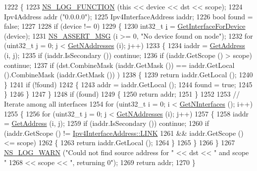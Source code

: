\begin{DoxyCode}
1222 \{
1223   \hyperlink{log-macros-disabled_8h_a90b90d5bad1f39cb1b64923ea94c0761}{NS\_LOG\_FUNCTION} (\textcolor{keyword}{this} << device << dst << scope);
1224   Ipv4Address addr (\textcolor{stringliteral}{"0.0.0.0"});
1225   Ipv4InterfaceAddress iaddr; 
1226   \textcolor{keywordtype}{bool} found = \textcolor{keyword}{false};
1227 
1228   \textcolor{keywordflow}{if} (device != 0)
1229     \{
1230       int32\_t \hyperlink{bernuolliDistribution_8m_a6f6ccfcf58b31cb6412107d9d5281426}{i} = \hyperlink{classns3_1_1Ipv4L3Protocol_a4640baab6b3879020a4146f17e293321}{GetInterfaceForDevice} (device);
1231       \hyperlink{assert_8h_aff5ece9066c74e681e74999856f08539}{NS\_ASSERT\_MSG} (i >= 0, \textcolor{stringliteral}{"No device found on node"});
1232       \textcolor{keywordflow}{for} (uint32\_t j = 0; j < \hyperlink{classns3_1_1Ipv4L3Protocol_ab816ec1b5f680117bc1363b3d9649b22}{GetNAddresses} (i); j++)
1233         \{
1234           iaddr = \hyperlink{classns3_1_1Ipv4L3Protocol_a85fa4287313a773dee29aa73fa74a7e0}{GetAddress} (i, j);
1235           \textcolor{keywordflow}{if} (iaddr.IsSecondary ()) \textcolor{keywordflow}{continue};
1236           \textcolor{keywordflow}{if} (iaddr.GetScope () > scope) \textcolor{keywordflow}{continue}; 
1237           \textcolor{keywordflow}{if} (dst.CombineMask (iaddr.GetMask ())  == iaddr.GetLocal ().CombineMask (iaddr.GetMask ()) )
1238             \{
1239               \textcolor{keywordflow}{return} iaddr.GetLocal ();
1240             \}
1241           \textcolor{keywordflow}{if} (!found)
1242             \{
1243               addr = iaddr.GetLocal ();
1244               found = \textcolor{keyword}{true};
1245             \}
1246         \}
1247     \}
1248   \textcolor{keywordflow}{if} (found)
1249     \{
1250       \textcolor{keywordflow}{return} addr;
1251     \}
1252 
1253   \textcolor{comment}{// Iterate among all interfaces}
1254   \textcolor{keywordflow}{for} (uint32\_t i = 0; i < \hyperlink{classns3_1_1Ipv4L3Protocol_a6ab2be11c0df97f2d1170bbc737c9628}{GetNInterfaces} (); i++)
1255     \{
1256       \textcolor{keywordflow}{for} (uint32\_t j = 0; j < \hyperlink{classns3_1_1Ipv4L3Protocol_ab816ec1b5f680117bc1363b3d9649b22}{GetNAddresses} (i); j++)
1257         \{
1258           iaddr = \hyperlink{classns3_1_1Ipv4L3Protocol_a85fa4287313a773dee29aa73fa74a7e0}{GetAddress} (i, j);
1259           \textcolor{keywordflow}{if} (iaddr.IsSecondary ()) \textcolor{keywordflow}{continue};
1260           \textcolor{keywordflow}{if} (iaddr.GetScope () != \hyperlink{classns3_1_1Ipv4InterfaceAddress_a329cea433e74f717c26c9e51c4fcd3d8a0608c8dc6260f682341cb3a1629237ec}{Ipv4InterfaceAddress::LINK} 
1261               && iaddr.GetScope () <= scope) 
1262             \{
1263               \textcolor{keywordflow}{return} iaddr.GetLocal ();
1264             \}
1265         \}
1266     \}
1267   \hyperlink{group__logging_gade7208b4009cdf0e25783cd26766f559}{NS\_LOG\_WARN} (\textcolor{stringliteral}{"Could not find source address for "} << dst << \textcolor{stringliteral}{" and scope "} 
1268                                                     << scope << \textcolor{stringliteral}{", returning 0"});
1269   \textcolor{keywordflow}{return} addr;
1270 \}
\end{DoxyCode}


